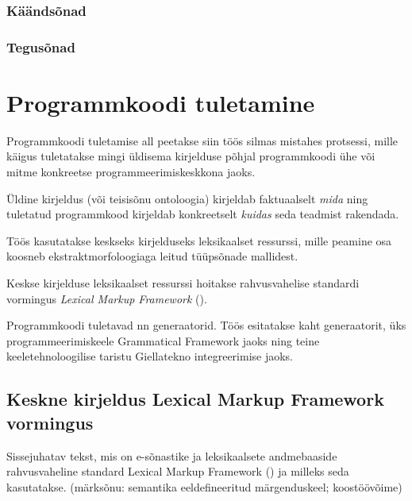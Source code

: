 \documentclass[12pt,a4paper]{article}
\begin{document}
\subsubsection{Käändsõnad}

\subsubsection{Tegusõnad}




\newpage
\section{Programmkoodi tuletamine}
\label{sec:programmkoodi-tuletamine}

Programmkoodi tuletamise all peetakse siin töös silmas mistahes protsessi, mille käigus tuletatakse mingi üldisema kirjelduse põhjal programmkoodi ühe või mitme konkreetse programmeerimiskeskkona jaoks.

Üldine kirjeldus (või teisisõnu ontoloogia) kirjeldab faktuaalselt \textit{mida} ning tuletatud programmkood kirjeldab konkreetselt \textit{kuidas} seda teadmist rakendada.

Töös kasutatakse keskseks kirjelduseks leksikaalset ressurssi, mille peamine osa koosneb ekstraktmorfoloogiaga leitud tüüpsõnade mallidest.

Keskse kirjelduse leksikaalset ressurssi hoitakse rahvusvahelise standardi vormingus \textit{Lexical Markup Framework} (\cite{iso/tc_37/sc_4_language_2007}).

Programmkoodi tuletavad nn generaatorid. Töös esitatakse kaht generaatorit, üks programmeerimiskeele Grammatical Framework jaoks ning teine keeletehnoloogilise taristu Giellatekno integreerimise jaoks.




\subsection{Keskne kirjeldus Lexical Markup Framework vormingus}

Sissejuhatav tekst, mis on e-sõnastike ja leksikaalsete andmebaaside rahvusvaheline standard Lexical Markup Framework (\cite{iso/tc_37/sc_4_language_2007}) ja milleks seda kasutatakse. (märksõnu: semantika eeldefineeritud märgenduskeel; koostöövõime)
\end{document}
